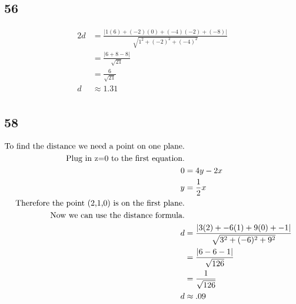 \documentclass{article}%
\begin{document}
%
\subsection*{56}%
\begin{alignat*}{2}%
d &= \frac{|1(6)+(-2)(0)+(-4)(-2) + (-8)|}{\sqrt{1^2+(-2)^2+(-4)^2}}\\%
&= \frac{|6+8-8|}{\sqrt{21}}\\%
&= \frac{6}{\sqrt{21}}\\ %
d &\approx 1.31\\%
\end{alignat*}

%
\subsection*{58}%
\begin{alignat*}{2}%
\textnormal{To find the distance we need a point on one plane.}\\%
\textnormal{Plug in z=0 to the first equation.}\\%
0 &= 4y - 2x\\%
y &= \frac{1}{2}x\\%
\textnormal{Therefore the point (2,1,0) is on the first plane.}\\%
\textnormal{Now we can use the distance formula.}\\%
d &= \frac{|3(2) + -6(1) + 9(0) + -1|}{\sqrt{3^2+(-6)^2+9^2}}\\%
&= \frac{|6-6-1|}{\sqrt{126}}\\%
&= \frac{1}{\sqrt{126}}\\%
d & \approx .09\\%
\end{alignat*}

%
\end{document}
